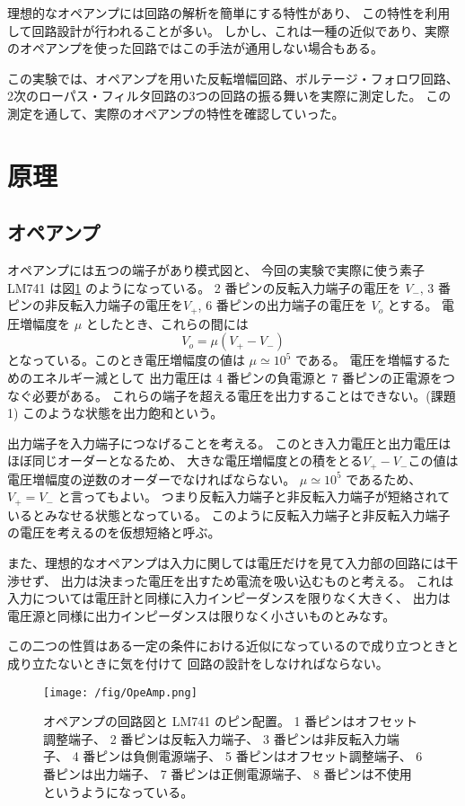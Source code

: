 \documentclass[11pt,dvipdfmx,a4paper]{jsarticle}
\begin{document}
理想的なオペアンプには回路の解析を簡単にする特性があり、
この特性を利用して回路設計が行われることが多い。
しかし、これは一種の近似であり、実際のオペアンプを使った回路ではこの手法が通用しない場合もある。

この実験では、オペアンプを用いた反転増幅回路、ボルテージ・フォロワ回路、2次のローパス・フィルタ回路の3つの回路の振る舞いを実際に測定した。
この測定を通して、実際のオペアンプの特性を確認していった。

\section{原理}
\subsection{オペアンプ}

オペアンプには五つの端子があり模式図と、
今回の実験で実際に使う素子 LM741 は図\ref{fig:no1} のようになっている。
2 番ピンの反転入力端子の電圧を \(V_{-}\), 3 番ピンの非反転入力端子の電圧を\(V_{+}\), 6 番ピンの出力端子の電圧を \(V_o\) とする。
電圧増幅度を \(\mu\) としたとき、これらの間には
\begin{equation}
	V_o = \mu (V_{+} - V_{-})
\end{equation}
となっている。このとき電圧増幅度の値は \(\mu\simeq 10^5\) である。
電圧を増幅するためのエネルギー減として
出力電圧は 4 番ピンの負電源と 7 番ピンの正電源をつなぐ必要がある。
これらの端子を超える電圧を出力することはできない。(課題1)
このような状態を出力飽和という。

出力端子を入力端子につなげることを考える。
このとき入力電圧と出力電圧はほぼ同じオーダーとなるため、
大きな電圧増幅度との積をとる\(V_{+} - V_{-}\)この値は 電圧増幅度の逆数のオーダーでなければならない。
\(\mu\simeq10^5\) であるため、\(V_{+}=V_{-}\) と言ってもよい。
つまり反転入力端子と非反転入力端子が短絡されているとみなせる状態となっている。
このように反転入力端子と非反転入力端子の電圧を考えるのを仮想短絡と呼ぶ。

また、理想的なオペアンプは入力に関しては電圧だけを見て入力部の回路には干渉せず、
出力は決まった電圧を出すため電流を吸い込むものと考える。
これは入力については電圧計と同様に入力インピーダンスを限りなく大きく、
出力は電圧源と同様に出力インピーダンスは限りなく小さいものとみなす。

この二つの性質はある一定の条件における近似になっているので成り立つときと成り立たないときに気を付けて
回路の設計をしなければならない。
\begin{figure}[H]
	\centering
	\texttt{[image: /fig/OpeAmp.png]}
	\caption{オペアンプの回路図と LM741 のピン配置。
	1 番ピンはオフセット調整端子、
	2 番ピンは反転入力端子、
	3 番ピンは非反転入力端子、
	4 番ピンは負側電源端子、
	5 番ピンはオフセット調整端子、
	6 番ピンは出力端子、
	7 番ピンは正側電源端子、
	8 番ピンは不使用というようになっている。}
	\label{fig:no1}
\end{figure}
\newpage
\end{document}
